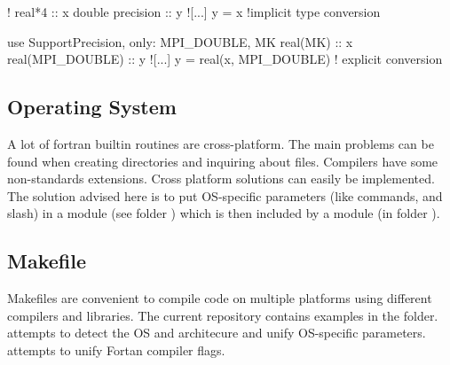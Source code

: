 \documentclass{article}
\begin{document}
\begin{codea}
!
real*4           :: x
double precision :: y
![...]
y = x  !implicit type conversion
\end{codea} 
\begin{codeb}
use SupportPrecision, only: MPI_DOUBLE, MK
real(MK)         :: x
real(MPI_DOUBLE) :: y
![...]
y = real(x, MPI_DOUBLE) ! explicit conversion 
\end{codeb}

\subsection{Operating System}
\label{sec:os}
A lot of fortran builtin routines are cross-platform. 
The main problems can be found when creating directories and inquiring about files.
Compilers have some non-standards extensions. Cross platform solutions can easily be implemented.
The solution advised here is to put OS-specific parameters (like commands, and slash) in a module  (see folder ) which is then included by a  module (in folder ).


\subsection{Makefile}
\label{sec:makefile}
Makefiles are convenient to compile code on multiple platforms using different compilers and libraries. The current repository contains examples in the \cmd{_\mkf} folder.
 attempts to detect the OS and architecure and unify OS-specific parameters.
 attempts to unify Fortan compiler flags.

\end{document}
